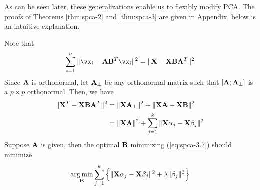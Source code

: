 As can be seen later, these generalizations enable us to flexibly modify PCA. The proofs of Theorems \ref{thm:spca-2} and \ref{thm:spca-3} are given in Appendix, below is an intuitive explanation. 

Note that 
\begin{equation}
	\label{eq:spca-3.8}
	\sum_{i=1}^n \|\vx_i - \vA\vB^T \vx_i\|^2 = \|\vX - \vX\vB\vA^T\|^2
\end{equation}
Since $\mathbf{A}$ is orthonormal, let $\mathbf{A}_\perp$ be any orthonormal matrix such that $[\mathbf{A};\mathbf{A}_\perp]$ is a $p\times p$ orthonormal. Then, we have 
\begin{align}
	\label{eq:spca-3.9}
    \|\mathbf{X}^T - \mathbf{X}\mathbf{B}\mathbf{A}^T\|^2 &= \|\mathbf{X}\mathbf{A}_\perp\|^2 + \|\mathbf{X}\mathbf{A} -\mathbf{X}\mathbf{B}\|^2 \\
    \label{eq:spca-3.10}
    &= \|\mathbf{X}\mathbf{A}\|^2 + \sum_{j=1}^k \|\mathbf{X}\alpha_j - \mathbf{X}\beta_j\|^2
\end{align}
Suppose $\mathbf{A}$ is given, then the optimal $\mathbf{B}$ minimizing (\ref{eq:spca-3.7}) should minimize 
\begin{equation}
 	\label{eq:spca-3.11}
 	\operatorname*{arg\,min}_{\mathbf{B}} \sum_{j=1}^k \left\{\|\mathbf{X}\alpha_j - \mathbf{X}\beta_j\|^2 + \lambda \|\beta_j\|^2\right\}
 \end{equation} 




